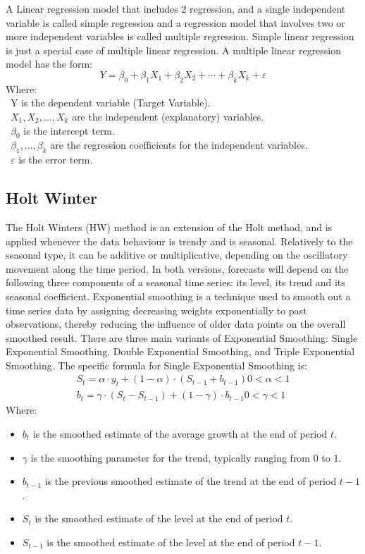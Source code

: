 \documentclass[conference]{IEEEtran}
\begin{document}
A Linear regression model that includes 2 regression, and a single independent variable is called simple regression and a regression model that involves two or more independent variables is called multiple regression. Simple linear regression is just a special case of multiple linear regression. A multiple linear regression model has the form: \cite{linearRegressionMethod} \\
\[Y=\beta_0+\beta_1X_1+\beta_2X_2+\cdots+\beta_kX_k+\varepsilon\]
Where:\\
	\indent\textbullet\ Y is the dependent variable (Target Variable).\\
	\indent\textbullet\ \(X_1, X_2, \ldots, X_k\) are the independent (explanatory) variables.\\
	\indent\textbullet\ \(\beta_0\) is the intercept term.\\
	\indent\textbullet\ \(\beta_1,..., \beta_k\) are the regression coefficients for the independent variables.\\
	\indent\textbullet\ \(\varepsilon\) is the error term.

\subsection{Holt Winter}
The Holt Winters (HW) method is an extension of the Holt method, and is applied whenever the data behaviour is trendy and is seasonal. Relatively to the seasonal type, it can be additive or multiplicative, depending on the oscillatory movement along the time period. In both versions, forecasts will depend on the following three components of a seasonal time series: its level, its trend and its seasonal coefficient. \cite{HoltWinter1} Exponential smoothing is a technique used to smooth out a time series data by assigning decreasing weights exponentially to past observations, thereby reducing the influence of older data points on the overall smoothed result.
There are three main variants of Exponential Smoothing: Single Exponential Smoothing, Double Exponential Smoothing, and Triple Exponential Smoothing.
The specific formula for Single Exponential Smoothing is: \cite{HoltWinter2}
\begin{align*}
S_t = \alpha \cdot y_t + (1 - \alpha) \cdot (S_{t-1} + b_{t-1}) 0 < α < 1
\\
b_t = \gamma \cdot (S_t - S_{t-1}) + (1 - \gamma) \cdot b_{t-1} 0 < γ < 1 
\end{align*}
Where: 
\begin{itemize}
\item $b_t$ is the smoothed estimate of the average growth at the end of period $t$.
\item $\gamma$ is the smoothing parameter for the trend, typically ranging from $0$ to $1$.
\item $b_{t-1}$ is the previous smoothed estimate of the trend at the end of period $t-1$.
\item $S_t$ is the smoothed estimate of the level at the end of period $t$.
\item $S_{t-1}$ is the smoothed estimate of the level at the end of period $t-1$.
\end{itemize}
\end{document}
